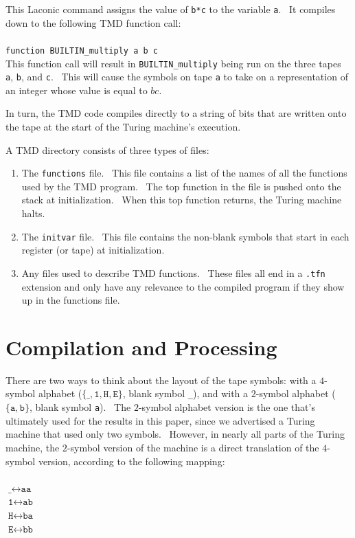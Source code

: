 \documentclass[11pt]{article}
\begin{document}
This Laconic command assigns the value of \texttt{b*c} to the variable \texttt{a}. \ It compiles down to the following TMD function call: \\ \\
\texttt{function BUILTIN\_multiply a b c} \\

This function call will result in \texttt{BUILTIN\_multiply} being run on the three tapes \texttt{a}, \texttt{b}, and \texttt{c}. \ This will cause the symbols on tape \texttt{a} to take on a representation of an integer whose value is equal to $bc$.

In turn, the TMD code compiles directly to a string of bits that are written onto the tape at the start of the Turing machine's execution.

A TMD directory consists of three types of files:

\begin{enumerate}
\item The \texttt{functions} file. \ This file contains a list of the names of all the functions used by the TMD program. \ The top function in the file is pushed onto the stack at initialization. \ When this top function returns, the Turing machine halts.
\item The \texttt{initvar} file. \ This file contains the non-blank symbols that start in each register (or tape) at initialization.
\item Any files used to describe TMD functions. \ These files all end in a \texttt{.tfn} extension and only have any relevance to the compiled program if they show up in the functions file.
\end{enumerate}

\section{Compilation and Processing}
\label{sec:compandproc}

There are two ways to think about the layout of the tape symbols: with a $4$-symbol alphabet ($\{\texttt{\_}, \texttt{1}, \texttt{H}, \texttt{E}\}$, blank symbol \texttt{\_}), and with a $2$-symbol alphabet ($\{\texttt{a}, \texttt{b}\}$, blank symbol \texttt{a}). \ The $2$-symbol alphabet version is the one that's ultimately used for the results in this paper, since we advertised a Turing machine that used only two symbols. \ However, in nearly all parts of the Turing machine, the $2$-symbol version of the machine is a direct translation of the $4$-symbol version, according to the following mapping: \\ \\
$\texttt{\_} \leftrightarrow \texttt{aa}$ \\
$\texttt{1} \leftrightarrow \texttt{ab}$ \\
$\texttt{H} \leftrightarrow \texttt{ba}$ \\
$\texttt{E} \leftrightarrow \texttt{bb}$ \\
\end{document}
